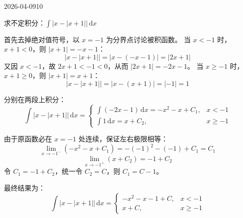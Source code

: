 \begin{mistake}{2026-04-09}{10}

\begin{problemcontent}
求不定积分：\(\displaystyle \int |x - |x + 1|| \, \mathrm{d}x \)
\end{problemcontent}

\begin{solutioncontent}
首先去掉绝对值符号，以 \(x = -1\) 为分界点讨论被积函数。
当 \(x < -1\) 时，\(x+1 < 0\)，则 \(|x+1| = -x-1\)：
\[ |x - |x+1|| = |x - (-x-1)| = |2x+1| \]
又因 \(x < -1\)，故 \(2x+1 < -1 < 0\)，从而 \(|2x+1| = -2x-1\)。
当 \(x \geqslant -1\) 时，\(x+1 \geqslant 0\)，则 \(|x+1| = x+1\)：
\[ |x - |x+1|| = |x - (x+1)| = |-1| = 1 \]

分别在两段上积分：
\[ 
\int |x - |x + 1|| \, \mathrm{d}x = 
\begin{cases} 
\int (-2x-1) \, \mathrm{d}x = -x^2 - x + C_1, & x < -1 \\ 
\int 1 \, \mathrm{d}x = x + C_2, & x \geqslant -1 
\end{cases}
\]

由于原函数必在 \(x = -1\) 处连续，保证左右极限相等：
\[ \lim_{x \to -1^-} (-x^2 - x + C_1) = -(-1)^2 - (-1) + C_1 = C_1 \]
\[ \lim_{x \to -1^+} (x + C_2) = -1 + C_2 \]
令 \(C_1 = -1 + C_2\)，统一令 \(C_2 = C\)，则 \(C_1 = C - 1\)。

最终结果为：
\[ \int |x - |x + 1|| \, \mathrm{d}x = \begin{cases} -x^2 - x - 1 + C, & x < -1 \\ x + C, & x \geqslant -1 \end{cases} \]
\end{solutioncontent}


\end{mistake}
